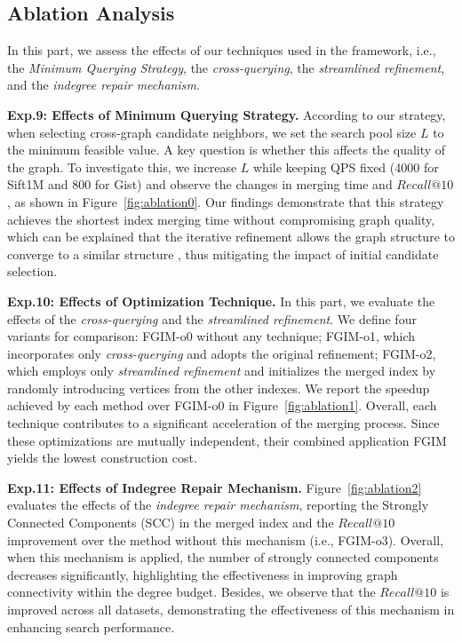 \documentclass[acmsmall]{acmart}
\theoremstyle{remark}
\theoremstyle{definition}
\begin{document}
\subsection{Ablation Analysis}
\label{subsec:ablation}

In this part, we assess the effects of our techniques used in the framework, i.e., the \textit{Minimum Querying Strategy}, the \textit{cross-querying}, the \textit{streamlined refinement}, and the \textit{indegree repair mechanism}.

\noindent\textbf{Exp.9: Effects of Minimum Querying Strategy.} According to our strategy, when selecting cross-graph candidate neighbors, we set the search pool size $L$ to the minimum feasible value. A key question is whether this affects the quality of the graph. To investigate this, we increase $L$ while keeping QPS fixed (4000 for Sift1M and 800 for Gist) and observe the changes in merging time and $Recall@10$, as shown in Figure~\ref{fig:ablation0}. Our findings demonstrate that this strategy achieves the shortest index merging time without compromising graph quality, which can be explained that the iterative refinement allows the graph structure to converge to a similar structure \cite{dong2011efficient}, thus mitigating the impact of initial candidate selection.

\noindent\textbf{Exp.10: Effects of Optimization Technique.} In this part, we evaluate the effects of the \textit{cross-querying} and the \textit{streamlined refinement}. We define four variants for comparison: FGIM-o0 without any technique; FGIM-o1, which incorporates only \textit{cross-querying} and adopts the original refinement; FGIM-o2, which employs only \textit{streamlined refinement} and initializes the merged index by randomly introducing vertices from the other indexes. We report the speedup achieved by each method over FGIM-o0 in Figure~\ref{fig:ablation1}. Overall, each technique contributes to a significant acceleration of the merging process. Since these optimizations are mutually independent, their combined application FGIM yields the lowest construction cost.

\noindent\textbf{Exp.11: Effects of Indegree Repair Mechanism.} Figure~\ref{fig:ablation2} evaluates the effects of the \textit{indegree repair mechanism}, reporting the Strongly Connected Components (SCC) in the merged index and the $Recall@10$ improvement over the method without this mechanism (i.e., FGIM-o3). Overall, when this mechanism is applied, the number of strongly connected components decreases significantly, highlighting the effectiveness in improving graph connectivity within the degree budget. Besides, we observe that the $Recall@10$ is improved across all datasets, demonstrating the effectiveness of this mechanism in enhancing search performance.
\end{document}
